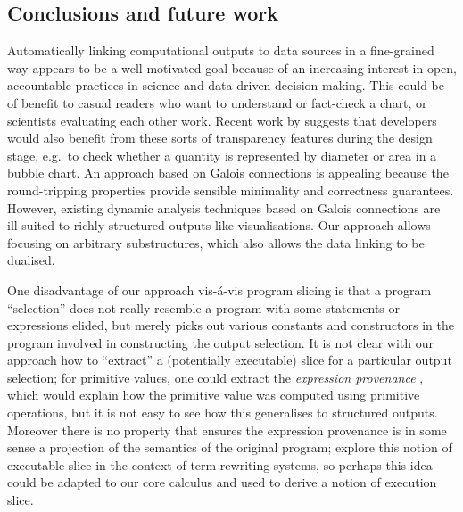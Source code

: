 \subsection{Conclusions and future work}
\label{sec:conclusion:conclusions-and-future-work}

Automatically linking computational outputs to data sources in a fine-grained way appears to be a well-motivated goal because of an increasing interest in open, accountable practices in science and data-driven decision making. This could be of benefit to casual readers who want to understand or fact-check a chart, or scientists evaluating each other work. Recent work by \citet{walny19} suggests that developers would also benefit from these sorts of transparency features during the design stage, e.g.~to check whether a quantity is represented by diameter or area in a bubble chart. An approach based on Galois connections is appealing because the round-tripping properties provide sensible minimality and correctness guarantees. However, existing dynamic analysis techniques based on Galois connections are ill-suited to richly structured outputs like visualisations. Our approach allows focusing on arbitrary substructures, which also allows the data linking to be dualised.

One disadvantage of our approach vis-\'a-vis program slicing is that a program ``selection'' does not really resemble a program with some statements or expressions elided, but merely picks out various constants and constructors in the program involved in constructing the output selection. It is not clear with our approach how to ``extract'' a (potentially executable) slice for a particular output selection; for primitive values, one could extract the \emph{expression provenance} \cite{acar12}, which would explain how the primitive value was computed using primitive operations, but it is not easy to see how this generalises to structured outputs. Moreover there is no property that ensures the expression provenance is in some sense a projection of the semantics of the original program; \citet{field98} explore this notion of executable slice in the context of term rewriting systems, so perhaps this idea could be adapted to our core calculus and used to derive a notion of execution slice.
